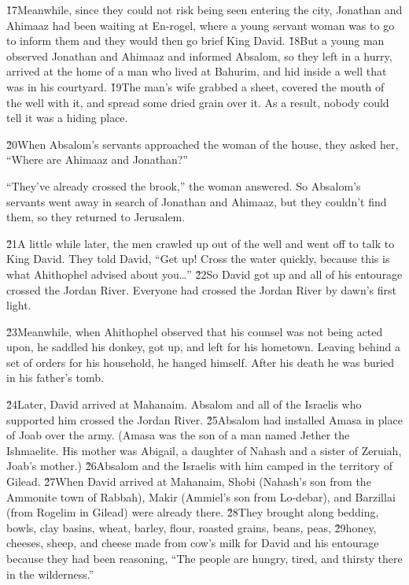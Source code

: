 \v{17}Meanwhile, since they could not risk being seen entering the city, Jonathan and Ahimaaz had been waiting at En-rogel, where a young servant woman was to go to inform them and they would then go brief King David. \v{18}But a young man observed Jonathan and Ahimaaz and informed Absalom, so they left in a hurry, arrived at the home of a man who lived at Bahurim, and hid inside a well that was in his courtyard. \v{19}The man's wife grabbed a sheet, covered the mouth of the well with it, and spread some dried grain over it. As a result, nobody could tell it was a hiding place.

\v{20}When Absalom's servants approached the woman of the house, they asked her, ``Where are Ahimaaz and Jonathan?''

``They've already crossed the brook,'' the woman answered. So Absalom's servants went away in search of Jonathan and Ahimaaz, but they couldn't find them, so they returned to Jerusalem.

\v{21}A little while later, the men crawled up out of the well and went off to talk to King David. They told David, ``Get up! Cross the water quickly, because this is what Ahithophel advised about you{\ldots}'' \v{22}So David got up and all of his entourage crossed the Jordan River. Everyone had crossed the Jordan River by dawn's first light.

\v{23}Meanwhile, when Ahithophel observed that his counsel was not being acted upon, he saddled his donkey, got up, and left for his hometown. Leaving behind a set of orders for his household, he hanged himself. After his death he was buried in his father's tomb.

\v{24}Later, David arrived at Mahanaim. Absalom and all of the Israelis who supported him crossed the Jordan River. \v{25}Absalom had installed Amasa in place of Joab over the army. (Amasa was the son of a man named Jether the Ishmaelite. His mother was Abigail, a daughter of Nahash and a sister of Zeruiah, Joab's mother.) \v{26}Absalom and the Israelis with him camped in the territory of Gilead. \v{27}When David arrived at Mahanaim, Shobi (Nahash's son from the Ammonite town of Rabbah), Makir (Ammiel's son from Lo-debar), and Barzillai (from Rogelim in Gilead) were already there. \v{28}They brought along bedding, bowls, clay basins, wheat, barley, flour, roasted grains, beans, peas, \v{29}honey, cheeses, sheep, and cheese made from cow's milk for David and his entourage because they had been reasoning, ``The people are hungry, tired, and thirsty there in the wilderness.''

